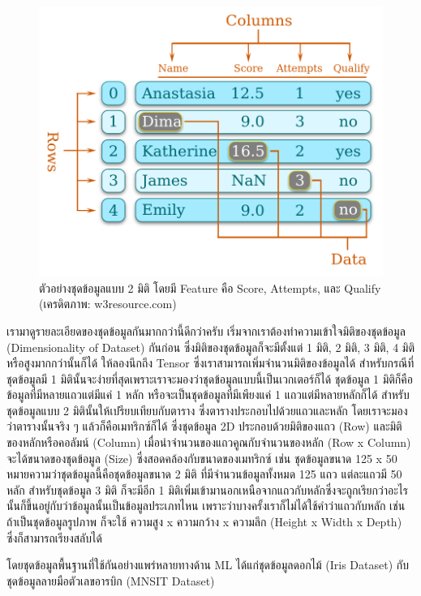 
\begin{figure}[htbp]
    \centering
    \includegraphics[width=0.7\linewidth]{fig/dataset.png}
    \caption{ตัวอย่างชุดข้อมูลแบบ 2 มิติ โดยมี Feature คือ Score, Attempts, และ Qualify (เครดิตภาพ: w3resource.com)}
    \label{fig:dataset}
\end{figure}

เรามาดูรายละเอียดของชุดข้อมูลกันมากกว่านี้ดีกว่าครับ เริ่มจากเราต้องทำความเข้าใจมิติของชุดข้อมูล (Dimensionality of Dataset) กันก่อน
ซึ่งมิติของชุดข้อมูลก็จะมีตั้งแต่ 1 มิติ, 2 มิติ, 3 มิติ, 4 มิติ หรือสูงมากกว่านั้นก็ได้ ให้ลองนึกถึง Tensor ซึ่งเราสามารถเพิ่มจำนวนมิติของข้อมูลได้
สำหรับกรณีที่ชุดข้อมูลมี 1 มิตินั้นจะง่ายที่สุดเพราะเราจะมองว่าชุดข้อมูลแบบนี้เป็นเวกเตอร์ก็ได้ ชุดข้อมูล 1 มิติก็คือข้อมูลที่มีหลายแถวแต่มีแค่ 1 หลัก 
หรือจะเป็นชุดข้อมูลที่มีเพียงแค่ 1 แถวแต่มีหลายหลักก็ได้ สำหรับชุดข้อมูลแบบ 2 มิตินั้นให้เปรียบเทียบกับตาราง ซึ่งตารางประกอบไปด้วยแถวและหลัก
โดยเราจะมองว่าตารางนั้นจริง ๆ แล้วก็คือเมทริกซ์ก็ได้ ซึ่งชุดข้อมูล 2D ประกอบด้วยมิติของแถว (Row) และมิติของหลักหรือคอลัมน์ (Column) 
เมื่อนำจำนวนของแถวคูณกับจำนวนของหลัก (Row x Column) จะได้ขนาดของชุดข้อมูล (Size) ซึ่งสอดคล้องกับขนาดของเมทริกซ์ เช่น 
ชุดข้อมูลขนาด 125 x 50 หมายความว่าชุดข้อมูลนี้คือชุดข้อมูลขนาด 2 มิติ ที่มีจำนวนข้อมูลทั้งหมด 125 แถว แต่ละแถวมี 50 หลัก 
สำหรับชุดข้อมูล 3 มิติ ก็จะมีอีก 1 มิติเพิ่มเข้ามานอกเหนือจากแถวกับหลักซึ่งจะถูกเรียกว่าอะไรนั้นก็ขึ้นอยู่กับว่าข้อมูลนั้นเป็นข้อมูลประเภทไหน 
เพราะว่าบางครั้งเราก็ไม่ได้ใช้คำว่าแถวกับหลัก เช่น ถ้าเป็นชุดข้อมูลรูปภาพ ก็จะใช้ ความสูง x ความกว้าง x ความลึก (Height x Width x Depth) 
ซึ่งก็สามารถเรียงสลับได้

โดยชุดข้อมูลพื้นฐานที่ใช้กันอย่างแพร่หลายทางด้าน ML ได้แก่ชุดข้อมูลดอกไม้ (Iris Dataset) กับชุดข้อมูลลายมือตัวเลขอารบิก (MNSIT 
Dataset)


